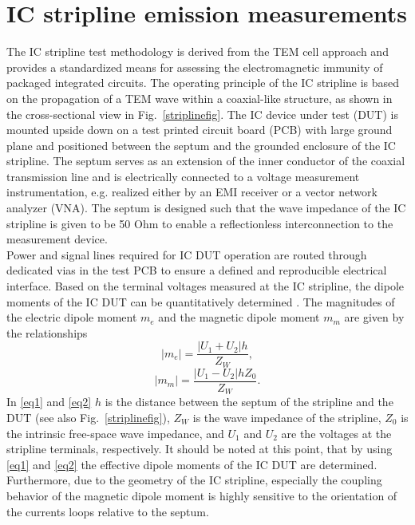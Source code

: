 \documentclass[conference]{IEEEtran}
\begin{document}
\section{IC stripline emission measurements}
The IC stripline test methodology \cite{b5} is derived from the TEM cell approach \cite{b3} and provides a standardized means for assessing the electromagnetic immunity of packaged integrated circuits. The operating principle of the IC stripline is based on the propagation of a TEM wave within a coaxial-like structure, as shown in the cross-sectional view in Fig.~\ref{striplinefig}.
The IC device under test (DUT) is mounted upside down on a test printed circuit board (PCB) with large ground plane and positioned between the septum and the grounded enclosure of the IC stripline. The septum serves as an extension of the inner conductor of the coaxial transmission line and is electrically connected to a voltage measurement instrumentation, e.g. realized either by an EMI receiver or a vector network analyzer (VNA). The septum is designed such that the wave impedance of the IC stripline is given to be 50 Ohm to enable a reflectionless interconnection to the measurement device.\\Power and signal lines required for IC DUT operation are routed through dedicated vias in the test PCB to ensure a defined and reproducible electrical interface.
Based on the terminal voltages measured at the IC stripline, the dipole moments of the IC DUT can be quantitatively determined \cite{b6}. The magnitudes of the electric dipole moment $m_e$ and the magnetic dipole moment $m_m$ are given by the relationships
\begin{equation}
|m_e| = \frac{|U_1 + U_2| h}{Z_W}, \label{eq1}
\end{equation}
\begin{equation}
|m_m| = \frac{|U_1 - U_2| h Z_0}{Z_W}. \label{eq2}
\end{equation}
In \eqref{eq1} and \eqref{eq2} $h$ is the distance between the septum of the stripline and the DUT (see also Fig.~\ref{striplinefig}), $Z_W$ is the wave impedance of the stripline, $Z_0$ is the intrinsic free-space wave impedance, and $U_1$ and $U_2$ are the voltages at the stripline terminals, respectively. It should be noted at this point, that by using \eqref{eq1} and \eqref{eq2} the effective dipole moments of the IC DUT are determined. Furthermore, due to the geometry of the IC stripline, especially the coupling behavior of the magnetic dipole moment is highly sensitive to the orientation of the currents loops relative to the septum.\\
\end{document}
